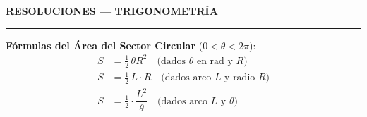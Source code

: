 \vspace{0.6cm}


\begin{tcolorbox}[
  enhanced,
  colback=AzulPizarra, colframe=AzulPizarra,
  arc=3pt, boxrule=0pt, left=10pt, right=10pt, top=5pt, bottom=5pt
]
  \centering
  {\large\sffamily\bfseries\color{white} RESOLUCIONES — TRIGONOMETRÍA}
  \quad\textcolor{DoradoAcadémico}{\rule{0.1\linewidth}{0.8pt}}
\end{tcolorbox}

\vspace{0.4cm}

\begin{cajaformula}
\textbf{Fórmulas del Área del Sector Circular} ($0 < \theta < 2\pi$):
\begin{align*}
  S &= \tfrac{1}{2}\,\theta R^2 \quad\text{(dados }\theta\text{ en rad y }R\text{)} \\[4pt]
  S &= \tfrac{1}{2}\,L\cdot R \quad\text{(dados arco }L\text{ y radio }R\text{)} \\[4pt]
  S &= \tfrac{1}{2}\cdot\dfrac{L^2}{\theta} \quad\text{(dados arco }L\text{ y }\theta\text{)}
\end{align*}
\end{cajaformula}

\vspace{0.4cm}

